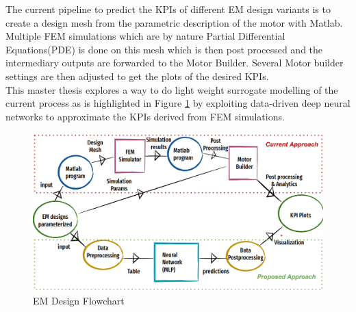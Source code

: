 \documentclass{report} %
\begin{document}


The current pipeline to predict the \ac{KPI}s of different \ac{EM} design variants is to create a design mesh from the parametric description of the motor with Matlab.
Multiple \ac{FEM} simulations which are by nature Partial Differential Equations(PDE) is done on this mesh which is then post processed and the intermediary outputs are forwarded to the Motor Builder.
Several Motor builder settings are then adjusted to get the plots of the desired \ac{KPI}s.\\
This master thesis explores a way to do light weight surrogate modelling of the current process as is highlighted in Figure \ref{fig:EM Design Flowchart} by 
exploiting data-driven deep neural networks to approximate the \ac{KPI}s derived from \ac{FEM} simulations.
\begin{figure}[H]
    \centering
    \includegraphics[width=1\textwidth]{./ReportImages/EM_design_flowchart_v2.png} 
    \caption{EM Design Flowchart}
    \label{fig:EM Design Flowchart}
\end{figure}
\end{document}

